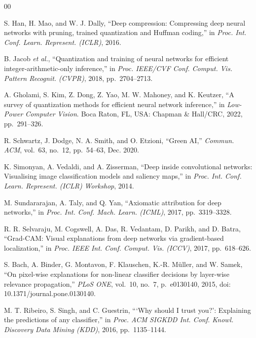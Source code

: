 \begin{thebibliography}{00}

S. Han, H. Mao, and W. J. Dally, ``Deep compression: Compressing deep neural
networks with pruning, trained quantization and Huffman coding,'' in
\textit{Proc. Int. Conf. Learn. Represent. (ICLR)}, 2016.

B. Jacob \textit{et al.}, ``Quantization and training of neural networks for
efficient integer-arithmetic-only inference,'' in \textit{Proc. IEEE/CVF Conf.
Comput. Vis. Pattern Recognit. (CVPR)}, 2018, pp.\ 2704--2713.

A. Gholami, S. Kim, Z. Dong, Z. Yao, M. W. Mahoney, and K. Keutzer, ``A survey
of quantization methods for efficient neural network inference,'' in
\textit{Low-Power Computer Vision}. Boca Raton, FL, USA: Chapman \& Hall/CRC,
2022, pp.\ 291--326.

R. Schwartz, J. Dodge, N. A. Smith, and O. Etzioni, ``Green AI,''
\textit{Commun. ACM}, vol.\ 63, no.\ 12, pp.\ 54--63, Dec. 2020.

K. Simonyan, A. Vedaldi, and A. Zisserman, ``Deep inside convolutional networks:
Visualising image classification models and saliency maps,'' in \textit{Proc.
Int. Conf. Learn. Represent. (ICLR) Workshop}, 2014.

M. Sundararajan, A. Taly, and Q. Yan, ``Axiomatic attribution for deep
networks,'' in \textit{Proc. Int. Conf. Mach. Learn. (ICML)}, 2017, pp.\
3319--3328.

R. R. Selvaraju, M. Cogswell, A. Das, R. Vedantam, D. Parikh, and D. Batra,
``Grad-CAM: Visual explanations from deep networks via gradient-based
localization,'' in \textit{Proc. IEEE Int. Conf. Comput. Vis. (ICCV)}, 2017,
pp.\ 618--626.

S. Bach, A. Binder, G. Montavon, F. Klauschen, K.-R. M\"uller, and W. Samek,
``On pixel-wise explanations for non-linear classifier decisions by layer-wise
relevance propagation,'' \textit{PLoS ONE}, vol.\ 10, no.\ 7, p.\ e0130140,
2015, doi: 10.1371/journal.pone.0130140.

M. T. Ribeiro, S. Singh, and C. Guestrin, ```Why should I trust you?':
Explaining the predictions of any classifier,'' in \textit{Proc. ACM SIGKDD Int.
Conf. Knowl. Discovery Data Mining (KDD)}, 2016, pp.\ 1135--1144.


\end{thebibliography}
